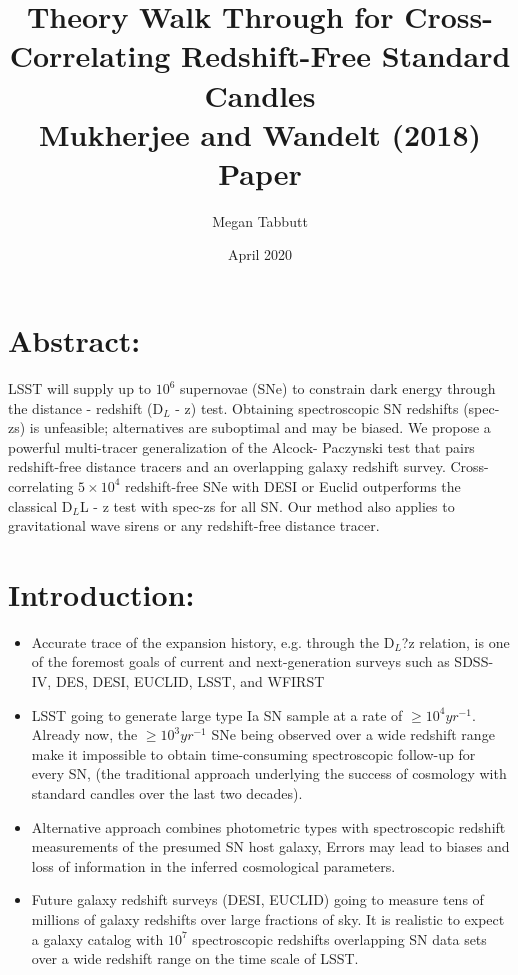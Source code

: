 \documentclass{article}
\title{ {\bf Theory Walk Through for Cross-Correlating Redshift-Free Standard Candles} \\
\vspace{10pt}
\LARGE Mukherjee and Wandelt (2018) Paper}
\date{April 2020}
\author{Megan Tabbutt}
\begin{document}
\doublespacing
\maketitle



\fontsize{11}{12}


\section{Abstract:}

LSST will supply up to $10^6$ supernovae (SNe) to constrain dark energy through the distance - redshift (D$_L$ - z) test. Obtaining spectroscopic SN redshifts (spec-zs) is unfeasible; alternatives are suboptimal and may be biased. We propose a powerful multi-tracer generalization of the Alcock- Paczynski test that pairs redshift-free distance tracers and an overlapping galaxy redshift survey. Cross-correlating $5\times 10^4$ redshift-free SNe with DESI or Euclid outperforms the classical D$_L$L - z test with spec-zs for all SN. Our method also applies to gravitational wave sirens or any redshift-free distance tracer.



\section{Introduction:}

\begin{itemize}

  \item Accurate trace of the expansion history, e.g. through the D$_L$?z relation, is one of the foremost goals of current and next-generation surveys such as SDSS-IV, DES, DESI, EUCLID, LSST, and WFIRST
  
  \item LSST going to generate large type Ia SN sample at a rate of $\ge 10^4 yr^{-1}$. Already now, the $\ge 10^3 yr^{-1}$ SNe being observed over a wide redshift range make it impossible to obtain time-consuming spectroscopic follow-up for every SN, (the traditional approach underlying the success of cosmology with standard candles over the last two decades). 
  
  \item Alternative approach combines photometric types with spectroscopic redshift measurements of the presumed SN host galaxy,  Errors may lead to biases and loss of information in the inferred cosmological parameters.
  
  \item Future galaxy redshift surveys (DESI, EUCLID)  going to measure tens of millions of galaxy redshifts over large fractions of sky. It is realistic to expect a galaxy catalog with $10^7$ spectroscopic redshifts overlapping SN data sets over a wide redshift range on the time scale of LSST.
  
\end{itemize}
\end{document}
